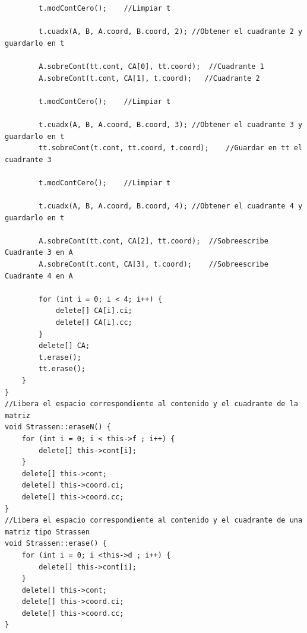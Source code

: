 \documentclass[12pt,letterpaper]{article}
\begin{document}
\begin{lstlisting}
		t.modContCero();	//Limpiar t
		
		t.cuadx(A, B, A.coord, B.coord, 2);	//Obtener el cuadrante 2 y guardarlo en t
		
		A.sobreCont(tt.cont, CA[0], tt.coord);	//Cuadrante 1
		A.sobreCont(t.cont, CA[1], t.coord);   //Cuadrante 2
		
		t.modContCero();	//Limpiar t
		
		t.cuadx(A, B, A.coord, B.coord, 3);	//Obtener el cuadrante 3 y guardarlo en t
		tt.sobreCont(t.cont, tt.coord, t.coord);	//Guardar en tt el cuadrante 3
		
		t.modContCero();	//Limpiar t
		
		t.cuadx(A, B, A.coord, B.coord, 4);	//Obtener el cuadrante 4 y guardarlo en t
	   
		A.sobreCont(tt.cont, CA[2], tt.coord);	//Sobreescribe Cuadrante 3 en A
		A.sobreCont(t.cont, CA[3], t.coord);	//Sobreescribe Cuadrante 4 en A
		
		for (int i = 0; i < 4; i++) {
			delete[] CA[i].ci;
			delete[] CA[i].cc;
		}
		delete[] CA;
		t.erase();
		tt.erase();
    }
}
//Libera el espacio correspondiente al contenido y el cuadrante de la matriz
void Strassen::eraseN() {
	for (int i = 0; i < this->f ; i++) {
		delete[] this->cont[i];
	}
	delete[] this->cont;
	delete[] this->coord.ci;
	delete[] this->coord.cc;
}
//Libera el espacio correspondiente al contenido y el cuadrante de una matriz tipo Strassen
void Strassen::erase() {
	for (int i = 0; i <this->d ; i++) {
		delete[] this->cont[i];
	}
	delete[] this->cont;
	delete[] this->coord.ci;
	delete[] this->coord.cc;
}
\end{lstlisting}
\end{document}
